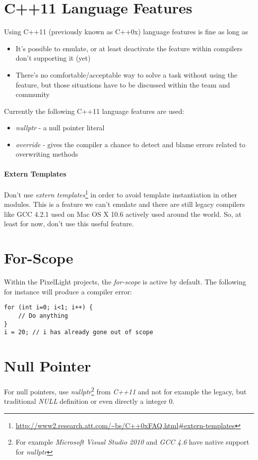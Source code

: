 \section{C++11 Language Features}
Using C++11 (previously known as C++0x) language features is fine as long as
\begin{itemize}
\item{It's possible to emulate, or at least deactivate the feature within compilers don't supporting it (yet)}
\item{There's no comfortable/acceptable way to solve a task without using the feature, but those situations have to be discussed within the team and community}
\end{itemize}
\textsl{}
Currently the following C++11 language features are used:
\begin{itemize}
\item{\emph{nullptr} - a null pointer literal}
\item{\emph{override} - gives the compiler a chance to detect and blame errors related to overwriting methods}
\end{itemize}


\paragraph{Extern Templates}
Don't use \emph{extern templates}\footnote{\url{http://www2.research.att.com/~bs/C++0xFAQ.html\#extern-templates}} in order to avoid template instantiation in other modules. This is a feature we can't emulate and there are still legacy compilers like \ac{GCC} 4.2.1 used on Mac OS X 10.6 actively used around the world. So, at least for now, don't use this useful feature.




\section{For-Scope}
Within the PixelLight projects, the \emph{for-scope} is active by default. The following for instance will produce a compiler error:
\begin{lstlisting}[caption=for-scope]
for (int i=0; i<1; i++) {
	// Do anything
}
i = 20;	// i has already gone out of scope
\end{lstlisting}




\section{Null Pointer}
For null pointers, use \emph{nullptr}\footnote{For example \emph{Microsoft Visual Studio 2010} and \emph{\ac{GCC} 4.6} have native support for \emph{nullptr}} from \emph{C++11} and not for example the legacy, but traditional \emph{NULL} definition or even directly a integer $0$.

